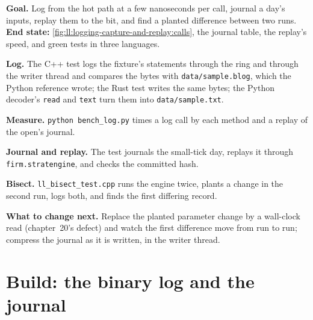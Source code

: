 \begin{tutorial}
\textbf{Goal.} Log from the hot path at a few nanoseconds per call, journal a day's inputs, replay them to the bit, and find a
planted difference between two runs. \textbf{End state:} \cref{fig:ll:logging-capture-and-replay:calls}, the journal table,
the replay's speed, and green tests in three languages.
\begin{tutsteps}
\item \textbf{Log.} The C++ test logs the fixture's statements through the ring and through the writer thread and compares the
bytes with \texttt{data/sample.blog}, which the Python reference wrote; the Rust test writes the same bytes; the Python decoder's \texttt{read} and \texttt{text} turn them into
\texttt{data/sample.txt}.
\item \textbf{Measure.} \texttt{python bench\_log.py} times a log call by each method and a replay of the open's journal.
\item \textbf{Journal and replay.} The test journals the small-tick day, replays it through \texttt{firm.stratengine}, and
checks the committed hash.
\item \textbf{Bisect.} \texttt{ll\_bisect\_test.cpp} runs the engine twice, plants a change in the second run, logs both, and
finds the first differing record.
\end{tutsteps}
\textbf{What to change next.} Replace the planted parameter change by a wall-clock read (chapter~20's defect) and watch the
first difference move from run to run; compress the journal as it is written, in the writer thread.
\end{tutorial}

\section{Build: the binary log and the journal}\label{bld:ll:logging-capture-and-replay:binlog}

